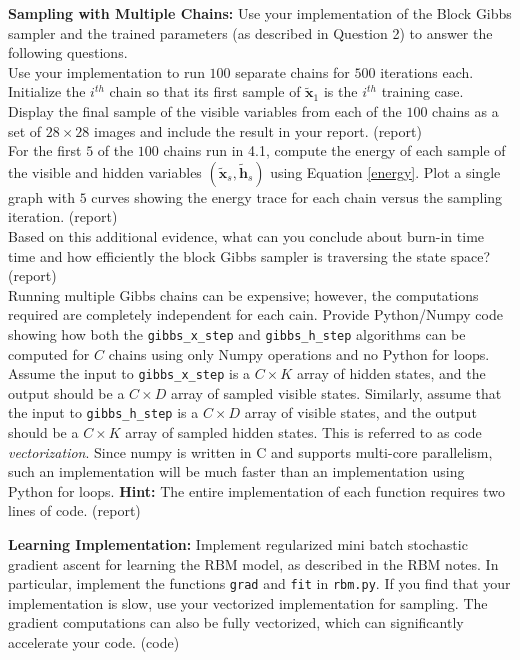 \documentclass[11pt]{article}
\newcommand{\mbf}[1]{{\mathbf{#1}}}
\begin{document}
\begin{problem}{20} \textbf{Sampling with Multiple Chains:} Use your implementation of the Block Gibbs sampler and the trained parameters (as described in Question 2) to answer the following questions.\\

  Use your implementation to run $100$ separate chains for $500$ iterations each. Initialize the $i^{th}$ chain so that
its first sample of $\tilde{\mbf{x}}_1$ is the $i^{th}$ training case. Display the final sample of the visible variables from each of the $100$ chains as a set of $28 \times 28$ images and include the result in your report. (report) \\

 For the first $5$ of the $100$ chains run in 4.1, compute the energy of each sample of the visible and hidden variables $(\tilde{\mbf{x}}_{s},\tilde{\mbf{h}}_{s})$ using Equation \ref{energy}. Plot a single graph with $5$ curves showing the energy trace for each chain versus the sampling iteration. (report)\\

 Based on this additional evidence, what can you conclude about burn-in time time and how efficiently the block Gibbs sampler is traversing the state space? (report) \\

 Running multiple Gibbs chains can be expensive; however, the computations required are completely independent for each cain. Provide Python/Numpy code showing how both the \verb|gibbs_x_step|   and \verb|gibbs_h_step|  algorithms can be computed for $C$ chains using only Numpy operations and no Python for loops. Assume the input to \verb|gibbs_x_step|  is a $C\times K$ array of hidden states, and the output should be a $C\times D$ array of sampled visible states. Similarly, assume that the input to  \verb|gibbs_h_step| is a $C\times D$ array of visible states, and the output should be a
$C\times K$ array of sampled hidden states. This is referred to as code \textit{vectorization}. Since numpy is written in C and supports multi-core parallelism, such an implementation will be much faster than an implementation using Python for loops. \textbf{Hint:} The entire implementation of each function requires two lines of code. (report)

\end{problem}

\begin{problem}{15} \textbf{Learning Implementation:} Implement regularized mini batch stochastic gradient ascent for learning the RBM model, as described in the RBM notes. In particular, implement the functions \verb|grad| and \verb|fit| in \verb|rbm.py|. If you find that your implementation is slow, use your vectorized implementation for sampling. The gradient computations can also be fully
vectorized, which can significantly accelerate your code. (code)
\end{problem}
	
\end{document}

